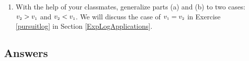 \documentclass{ximera}
\begin{document}
\begin{enumerate}
\begin{enumerate}
\item  With the help of your classmates, generalize parts (a) and (b) to two cases:  $v_{\mbox{\tiny$2$}} > v_{\mbox{\tiny$1$}}$ and $v_{\mbox{\tiny$2$}} < v_{\mbox{\tiny$1$}}$.   We will discuss the case of $v_{\mbox{\tiny$1$}} = v_{\mbox{\tiny$2$}}$ in Exercise \ref{pursuitlog} in Section \ref{ExpLogApplications}.

\end{enumerate}

\setcounter{HW}{\value{enumi}}
\end{enumerate}

\newpage

\subsection{Answers}
\end{document}
